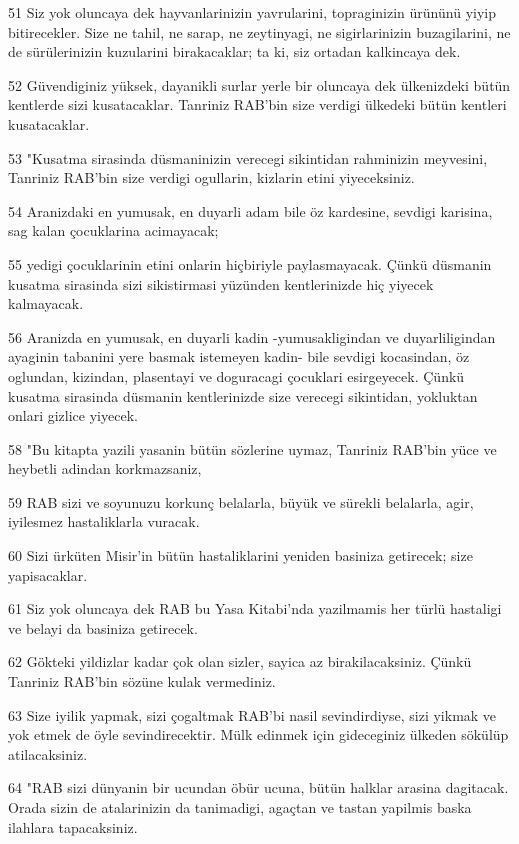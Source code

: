 \par 51 Siz yok oluncaya dek hayvanlarinizin yavrularini, topraginizin ürününü yiyip bitirecekler. Size ne tahil, ne sarap, ne zeytinyagi, ne sigirlarinizin buzagilarini, ne de sürülerinizin kuzularini birakacaklar; ta ki, siz ortadan kalkincaya dek.
\par 52 Güvendiginiz yüksek, dayanikli surlar yerle bir oluncaya dek ülkenizdeki bütün kentlerde sizi kusatacaklar. Tanriniz RAB'bin size verdigi ülkedeki bütün kentleri kusatacaklar.
\par 53 "Kusatma sirasinda düsmaninizin verecegi sikintidan rahminizin meyvesini, Tanriniz RAB'bin size verdigi ogullarin, kizlarin etini yiyeceksiniz.
\par 54 Aranizdaki en yumusak, en duyarli adam bile öz kardesine, sevdigi karisina, sag kalan çocuklarina acimayacak;
\par 55 yedigi çocuklarinin etini onlarin hiçbiriyle paylasmayacak. Çünkü düsmanin kusatma sirasinda sizi sikistirmasi yüzünden kentlerinizde hiç yiyecek kalmayacak.
\par 56 Aranizda en yumusak, en duyarli kadin -yumusakligindan ve duyarliligindan ayaginin tabanini yere basmak istemeyen kadin- bile sevdigi kocasindan, öz oglundan, kizindan, plasentayi ve doguracagi çocuklari esirgeyecek. Çünkü kusatma sirasinda düsmanin kentlerinizde size verecegi sikintidan, yokluktan onlari gizlice yiyecek.
\par 58 "Bu kitapta yazili yasanin bütün sözlerine uymaz, Tanriniz RAB'bin yüce ve heybetli adindan korkmazsaniz,
\par 59 RAB sizi ve soyunuzu korkunç belalarla, büyük ve sürekli belalarla, agir, iyilesmez hastaliklarla vuracak.
\par 60 Sizi ürküten Misir'in bütün hastaliklarini yeniden basiniza getirecek; size yapisacaklar.
\par 61 Siz yok oluncaya dek RAB bu Yasa Kitabi'nda yazilmamis her türlü hastaligi ve belayi da basiniza getirecek.
\par 62 Gökteki yildizlar kadar çok olan sizler, sayica az birakilacaksiniz. Çünkü Tanriniz RAB'bin sözüne kulak vermediniz.
\par 63 Size iyilik yapmak, sizi çogaltmak RAB'bi nasil sevindirdiyse, sizi yikmak ve yok etmek de öyle sevindirecektir. Mülk edinmek için gideceginiz ülkeden sökülüp atilacaksiniz.
\par 64 "RAB sizi dünyanin bir ucundan öbür ucuna, bütün halklar arasina dagitacak. Orada sizin de atalarinizin da tanimadigi, agaçtan ve tastan yapilmis baska ilahlara tapacaksiniz.
